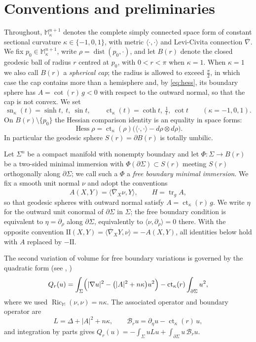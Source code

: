 \documentclass[11pt,a4paper]{amsart}
\theoremstyle{plain}
\theoremstyle{definition}
\newcommand{\M}{\mathbb{M}}
\newcommand{\ct}{\operatorname{ct}_\kappa}
\newcommand{\sn}{\operatorname{sn}_\kappa}
\newcommand{\Hess}{\operatorname{Hess}}
\newcommand{\Ric}{\operatorname{Ric}}
\newcommand{\tr}{\operatorname{tr}}
\newcommand{\dist}{\operatorname{dist}}
\newcommand{\bconn}{\overline{\nabla}}
\begin{document}
\section{Conventions and preliminaries}\label{sec:prelim}

Throughout, $\M^{n+1}_\kappa$ denotes the complete simply connected space form of constant sectional curvature $\kappa\in\{-1,0,1\}$, with metric $\langle\cdot,\cdot\rangle$ and Levi-Civita connection $\bconn$. We fix $p_0\in\M^{n+1}_\kappa$, write $\rho=\dist(p_0,\cdot)$, and let $B(r)$ denote the closed geodesic ball of radius $r$ centred at $p_0$, with $0<r<\pi$ when $\kappa=1$. When $\kappa=1$ we also call $B(r)$ a \emph{spherical cap}; the radius is allowed to exceed $\tfrac\pi2$, in which case the cap contains more than a hemisphere and, by \eqref{eq:hess}, its boundary sphere has $A=\cot(r)\,g<0$ with respect to the outward normal, so that the cap is not convex. We set
\[
\sn(t)=\sinh t,\ t,\ \sin t,\qquad \ct(t)=\coth t,\ \tfrac1t,\ \cot t\qquad(\kappa=-1,0,1).
\]
On $B(r)\setminus\{p_0\}$ the Hessian comparison identity is an equality in space forms:
\begin{equation}\label{eq:hess}
\Hess\rho=\ct(\rho)\bigl(\langle\cdot,\cdot\rangle-d\rho\otimes d\rho\bigr).
\end{equation}
In particular the geodesic sphere $S(r)=\partial B(r)$ is totally umbilic.

Let $\Sigma^n$ be a compact manifold with nonempty boundary and let $\Phi:\Sigma\to B(r)$ be a two-sided minimal immersion with $\Phi(\partial\Sigma)\subset S(r)$ meeting $S(r)$ orthogonally along $\partial\Sigma$; we call such a $\Phi$ a \emph{free boundary minimal immersion}. We fix a smooth unit normal $\nu$ and adopt the conventions
\[
A(X,Y)=\langle\bconn_X\nu,Y\rangle,\qquad H=\tr_g A,
\]
so that geodesic spheres with outward normal satisfy $A=\ct(r)\,g$. We write $\eta$ for the outward unit conormal of $\partial\Sigma$ in $\Sigma$; the free boundary condition is equivalent to $\eta=\partial_\rho$ along $\partial\Sigma$, equivalently to $\langle\nu,\partial_\rho\rangle=0$ there. With the opposite convention $\mathrm{II}(X,Y)=\langle\bconn_XY,\nu\rangle=-A(X,Y)$, all identities below hold with $A$ replaced by $-\mathrm{II}$.

The second variation of volume for free boundary variations is governed by the quadratic form (see \cite[\S 5]{Med23}, \cite[\S 2.3]{NZ1})
\begin{equation}\label{eq:secondvar}
Q_r(u)=\int_\Sigma\Bigl(|\nabla u|^2-\bigl(|A|^2+n\kappa\bigr)u^2\Bigr)-\ct(r)\int_{\partial\Sigma}u^2,
\end{equation}
where we used $\Ric_{\M}(\nu,\nu)=n\kappa$. The associated operator and boundary operator are
\[
L=\Delta+|A|^2+n\kappa,\qquad \mathcal{B}_r u=\partial_\eta u-\ct(r)\,u,
\]
and integration by parts gives $Q_r(u)=-\int_\Sigma uLu+\int_{\partial\Sigma}u\,\mathcal{B}_ru$.
\end{document}
